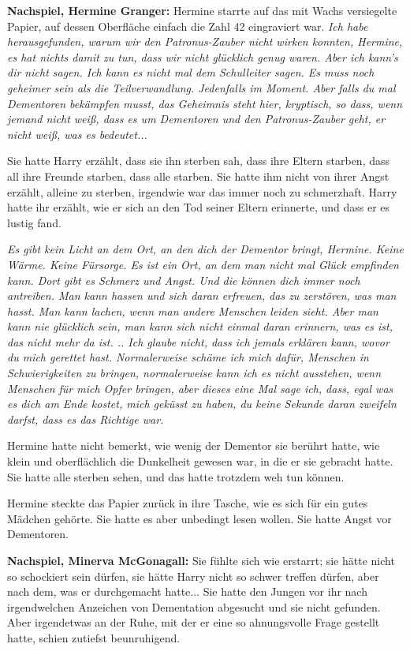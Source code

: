 \textbf{Nachspiel, Hermine Granger:}
Hermine starrte auf das mit Wachs versiegelte Papier, auf dessen Oberfläche
einfach die Zahl 42 eingraviert war.
\emph{Ich habe herausgefunden, warum wir den Patronus-Zauber nicht wirken
konnten, Hermine, es hat nichts damit zu tun, dass wir nicht glücklich genug
waren. Aber ich kann's dir nicht sagen. Ich kann es nicht mal dem Schulleiter
sagen. Es muss noch geheimer sein als die Teilverwandlung. Jedenfalls im Moment.
Aber falls du mal Dementoren bekämpfen musst, das Geheimnis steht hier,
kryptisch, so dass, wenn jemand nicht weiß, dass es um Dementoren und den
Patronus-Zauber geht, er nicht weiß, was es bedeutet...}

Sie hatte Harry erzählt, dass sie ihn sterben sah, dass ihre Eltern starben,
dass all ihre Freunde starben, dass alle starben. Sie hatte ihm nicht von ihrer
Angst erzählt, alleine zu sterben, irgendwie war das immer noch zu schmerzhaft.
Harry hatte ihr erzählt, wie er sich an den Tod seiner Eltern erinnerte, und
dass er es lustig fand.

\emph{Es gibt kein Licht an dem Ort, an den dich der Dementor bringt, Hermine.
Keine Wärme. Keine Fürsorge. Es ist ein Ort, an dem man nicht mal Glück
empfinden kann. Dort gibt es Schmerz und Angst. Und die können dich immer noch
antreiben. Man kann hassen und sich daran erfreuen, das zu zerstören, was man
hasst. Man kann lachen, wenn man andere Menschen leiden sieht. Aber man kann nie
glücklich sein, man kann sich nicht einmal daran erinnern, was es ist, das nicht
mehr da ist. .. Ich glaube nicht, dass ich jemals erklären kann, wovor du mich
gerettet hast. Normalerweise schäme ich mich dafür, Menschen in Schwierigkeiten
zu bringen, normalerweise kann ich es nicht ausstehen, wenn Menschen für mich
Opfer bringen, aber dieses eine Mal sage ich, dass, egal was es dich am Ende
kostet, mich geküsst zu haben, du keine Sekunde daran zweifeln darfst, dass es
das Richtige war.}

Hermine hatte nicht bemerkt, wie wenig der Dementor sie berührt hatte, wie klein
und oberflächlich die Dunkelheit gewesen war, in die er sie gebracht hatte. Sie
hatte alle sterben sehen, und das hatte trotzdem weh tun können.

Hermine steckte das Papier zurück in ihre Tasche, wie es sich für ein gutes
Mädchen gehörte. Sie hatte es aber unbedingt lesen wollen. Sie hatte Angst vor
Dementoren.

\textbf{Nachspiel, Minerva McGonagall:}
Sie fühlte sich wie erstarrt; sie hätte nicht so schockiert sein dürfen, sie
hätte Harry nicht so schwer treffen dürfen, aber nach dem, was er durchgemacht
hatte... Sie hatte den Jungen vor ihr nach irgendwelchen Anzeichen von
Dementation abgesucht und sie nicht gefunden. Aber irgendetwas an der Ruhe, mit
der er eine so ahnungsvolle Frage gestellt hatte, schien zutiefst beunruhigend.

